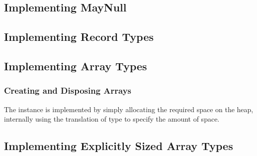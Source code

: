 \subsection{Implementing MayNull}
\label{impl-operations-null}

\subsection{Implementing Record Types}
\label{impl-operations-record}

\subsection{Implementing Array Types}
\label{impl-operations-array}

\subsubsection{Creating and Disposing Arrays}

The  instance is implemented by simply allocating the
required space on the heap, internally using the translation of type  to specify
the amount of space. 

\subsection{Implementing Explicitly Sized Array Types}
\label{impl-operations-array}

